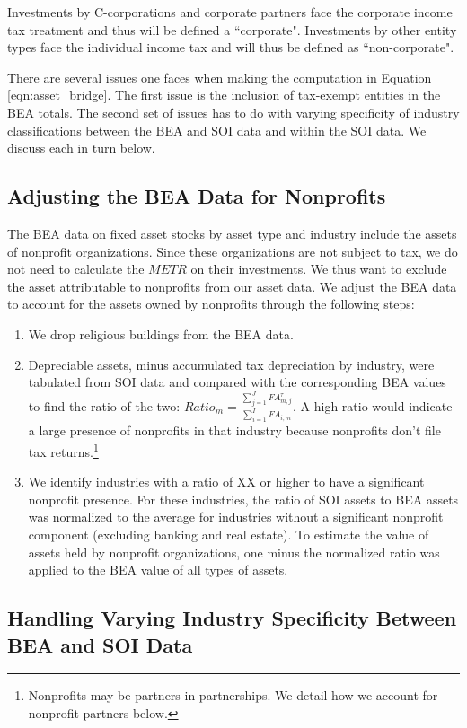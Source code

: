 \documentclass[article,11pt,letterpaper,fleqn]{article}
\theoremstyle{definition}
\numberwithin{equation}{section}
\begin{document}
Investments by C-corporations and corporate partners face the corporate income tax treatment and thus will be defined a ``corporate".  Investments by other entity types face the individual income tax and will thus be defined as ``non-corporate".

There are several issues one faces when making the computation in Equation \ref{eqn:asset_bridge}.  The first issue is the inclusion of tax-exempt entities in the BEA totals.  The second set of issues has to do with varying specificity of industry classifications between the BEA and SOI data and within the SOI data. We discuss each in turn below.

\subsection{Adjusting the BEA Data for Nonprofits}
The BEA data on fixed asset stocks by asset type and industry include the assets of nonprofit organizations. Since these organizations are not subject to tax, we do not need to calculate the $METR$ on their investments.  We thus want to exclude the asset attributable to nonprofits from our asset data.  We adjust the BEA data to account for the assets owned by nonprofits through the following steps:

\begin{enumerate}
\item We drop religious buildings from the BEA data.
\item Depreciable assets, minus accumulated tax depreciation by industry, were tabulated from SOI data and compared with the corresponding BEA values to find the ratio of the two: $Ratio_{m}=\frac{\sum_{j=1}^{J}FA^{\tau}_{m,j}}{\sum_{i=1}^{I}FA_{i,m}}$.  A high ratio would indicate a large presence of nonprofits in that industry because nonprofits don't file tax returns.\footnote{Nonprofits may be partners in partnerships.  We detail how we account for nonprofit partners below.}
\item We identify industries with a ratio of XX or higher to have a significant nonprofit presence.  For these industries, the ratio of SOI assets to BEA assets was normalized to the average for industries without a significant nonprofit component (excluding banking and real estate). To estimate the value of assets held by nonprofit organizations, one minus the normalized ratio was applied to the BEA value of all types of assets.
\end{enumerate}


\subsection{Handling Varying Industry Specificity Between BEA and SOI Data}
\end{document}
